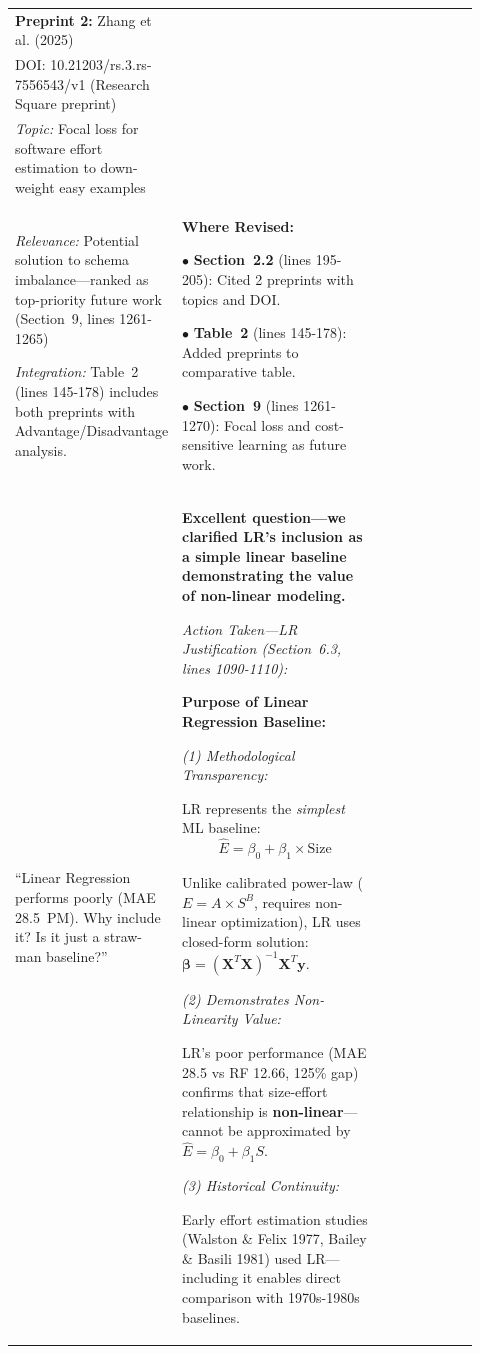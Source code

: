 \documentclass[11pt,a4paper]{article}
\begin{document}
\begin{longtable}{>{\raggedright\arraybackslash}p{0.26\linewidth}|>{\raggedright\arraybackslash}p{0.44\linewidth}|>{\raggedright\arraybackslash}p{0.22\linewidth}}
\textbf{Preprint 2:} Zhang et al. (2025)\\
DOI: 10.21203/rs.3.rs-7556543/v1 (Research Square preprint)\\
\textit{Topic:} Focal loss for software effort estimation to down-weight easy examples\\
\textit{Relevance:} Potential solution to schema imbalance---ranked as top-priority future work (Section~9, lines 1261-1265)

\textit{Integration:} Table~2 (lines 145-178) includes both preprints with Advantage/Disadvantage analysis. &

\textbf{Where Revised:}

$\bullet$ \textbf{Section~2.2} (lines 195-205): Cited 2 preprints with topics and DOI.

$\bullet$ \textbf{Table~2} (lines 145-178): Added preprints to comparative table.

$\bullet$ \textbf{Section~9} (lines 1261-1270): Focal loss and cost-sensitive learning as future work. \\

\midrule

``Linear Regression performs poorly (MAE 28.5~PM). Why include it? Is it just a straw-man baseline?'' &

\textbf{Excellent question---we clarified LR's inclusion as a simple linear baseline demonstrating the value of non-linear modeling.}

\textit{Action Taken---LR Justification (Section~6.3, lines 1090-1110):}

\textbf{Purpose of Linear Regression Baseline:}

\textit{(1) Methodological Transparency:}

LR represents the \textit{simplest} ML baseline:
$$\hat{E} = \beta_0 + \beta_1 \times \text{Size}$$

Unlike calibrated power-law ($E = A \times S^B$, requires non-linear optimization), LR uses closed-form solution: $\boldsymbol{\beta} = (\mathbf{X}^T\mathbf{X})^{-1}\mathbf{X}^T\mathbf{y}$.

\textit{(2) Demonstrates Non-Linearity Value:}

LR's poor performance (MAE 28.5 vs RF 12.66, 125\% gap) confirms that size-effort relationship is \textbf{non-linear}---cannot be approximated by $\hat{E} = \beta_0 + \beta_1 S$.

\textit{(3) Historical Continuity:}

Early effort estimation studies (Walston \& Felix 1977, Bailey \& Basili 1981) used LR---including it enables direct comparison with 1970s-1980s baselines.


\end{longtable}
\end{document}
